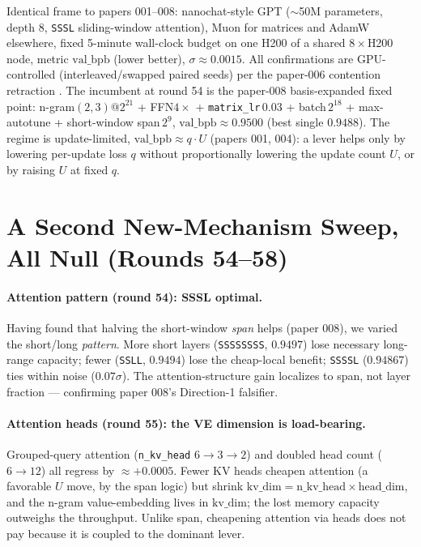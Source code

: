 \documentclass{article}
\newcommand{\valbpb}{\mathrm{val\_bpb}}
\begin{document}
Identical frame to papers 001--008: nanochat-style GPT \cite{karpathy2025nanochat} ($\sim$50M parameters, depth 8, \texttt{SSSL} sliding-window attention), Muon \cite{jordan2024muon} for matrices and AdamW elsewhere, fixed 5-minute wall-clock budget on one H200 of a shared $8\times$H200 node, metric $\valbpb$ (lower better), $\sigma\approx0.0015$. All confirmations are GPU-controlled (interleaved/swapped paired seeds) per the paper-006 contention retraction \cite{ophis2026retraction}. The incumbent at round 54 is the paper-008 basis-expanded fixed point: n-gram$(2,3)$@$2^{21}$ + FFN$4\times$ + \texttt{matrix\_lr}\,$0.03$ + batch\,$2^{18}$ + max-autotune + short-window span\,$2^{9}$, $\valbpb\approx0.9500$ (best single $0.9488$). The regime is update-limited, $\valbpb\approx q\cdot U$ (papers 001, 004): a lever helps only by lowering per-update loss $q$ without proportionally lowering the update count $U$, or by raising $U$ at fixed $q$.

\section{A Second New-Mechanism Sweep, All Null (Rounds 54--58)}
\label{sec:sweep}

\paragraph{Attention pattern (round 54): SSSL optimal.} Having found that halving the short-window \emph{span} helps (paper 008), we varied the short/long \emph{pattern}. More short layers (\texttt{SSSSSSSS}, $0.9497$) lose necessary long-range capacity; fewer (\texttt{SSLL}, $0.9494$) lose the cheap-local benefit; \texttt{SSSSL} ($0.94867$) ties within noise ($0.07\sigma$). The attention-structure gain localizes to span, not layer fraction --- confirming paper 008's Direction-1 falsifier.

\paragraph{Attention heads (round 55): the VE dimension is load-bearing.} Grouped-query attention (\texttt{n\_kv\_head} $6\to3\to2$) and doubled head count ($6\to12$) all regress by $\approx+0.0005$. Fewer KV heads cheapen attention (a favorable $U$ move, by the span logic) but shrink $\mathrm{kv\_dim}=\mathrm{n\_kv\_head}\times\mathrm{head\_dim}$, and the n-gram value-embedding lives in $\mathrm{kv\_dim}$; the lost memory capacity outweighs the throughput. Unlike span, cheapening attention via heads does not pay because it is coupled to the dominant lever.
\end{document}
